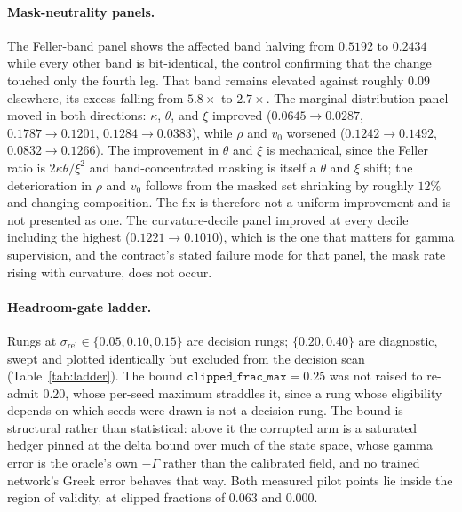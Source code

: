 \documentclass{article}
\begin{document}
\paragraph{Mask-neutrality panels.} The Feller-band panel shows the affected band
halving from $0.5192$ to $0.2434$ while every other band is bit-identical, the
control confirming that the change touched only the fourth leg. That band remains
elevated against roughly $0.09$ elsewhere, its excess falling from $5.8\times$ to
$2.7\times$. The marginal-distribution panel moved in both directions: $\kappa$,
$\theta$, and $\xi$ improved ($0.0645 \to 0.0287$, $0.1787 \to 0.1201$,
$0.1284 \to 0.0383$), while $\rho$ and $v_0$ worsened ($0.1242 \to 0.1492$,
$0.0832 \to 0.1266$). The improvement in $\theta$ and $\xi$ is mechanical, since the
Feller ratio is $2\kappa\theta/\xi^{2}$ and band-concentrated masking is itself a
$\theta$ and $\xi$ shift; the deterioration in $\rho$ and $v_0$ follows from the
masked set shrinking by roughly $12\%$ and changing composition. The fix is
therefore not a uniform improvement and is not presented as one. The
curvature-decile panel improved at every decile including the highest
($0.1221 \to 0.1010$), which is the one that matters for gamma supervision, and the
contract's stated failure mode for that panel, the mask rate rising with curvature,
does not occur.

\paragraph{Headroom-gate ladder.} Rungs at
$\sigma_{\mathrm{rel}} \in \{0.05, 0.10, 0.15\}$ are decision rungs;
$\{0.20, 0.40\}$ are diagnostic, swept and plotted identically but excluded from the
decision scan (Table~\ref{tab:ladder}). The bound
$\texttt{clipped\_frac\_max} = 0.25$ was not raised to re-admit $0.20$, whose
per-seed maximum straddles it, since a rung whose eligibility depends on which seeds
were drawn is not a decision rung. The bound is structural rather than statistical:
above it the corrupted arm is a saturated hedger pinned at the delta bound over much
of the state space, whose gamma error is the oracle's own $-\Gamma$ rather than the
calibrated field, and no trained network's Greek error behaves that way. Both
measured pilot points lie inside the region of validity, at clipped fractions of
$0.063$ and $0.000$.
\end{document}

